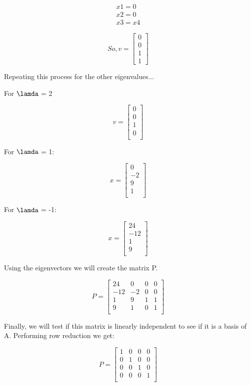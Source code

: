 \documentclass[11pt,addpoints]{exam}
\begin{document}
\begin{questions}
\begin{align*}
x1 = 0\\
x2 = 0\\
x3 = x4
\end{align*}

\[ So,
v = \begin{bmatrix}
0 \\
0 \\
1 \\
1
\end{bmatrix}
\]

Repeating this process for the other eigenvalues...

For $\lamda$ = 2

\[
v = \begin{bmatrix}
0 \\ 
0 \\ 
1 \\ 
0 \\
\end{bmatrix}
\]

For $\lamda$ = 1:

\[
x = \begin{bmatrix}
0 \\ 
-2 \\ 
9 \\ 
1 \\
\end{bmatrix}
\]

For $\lamda$ = -1:

\[
x = \begin{bmatrix}
24 \\ 
-12 \\ 
1\\
9 \\
\end{bmatrix}
\]

Using the eigenvectors we will create the matrix P.

\[
P = \begin{bmatrix}
24 & 0 & 0 & 0 \\
-12 & -2 & 0 & 0 \\
1 & 9 & 1 & 1 \\
9 & 1 & 0 & 1 \\
\end{bmatrix}
\]

Finally, we will test if this matrix is linearly independent to see if it is a basis of A. Performing row reduction we get:

\[
P = \begin{bmatrix}
1 & 0 & 0 & 0 \\
0 & 1 & 0 & 0 \\
0 & 0 & 1 & 0 \\
0 & 0 & 0 & 1 \\
\end{bmatrix}
\]


\end{questions}
\end{document}
